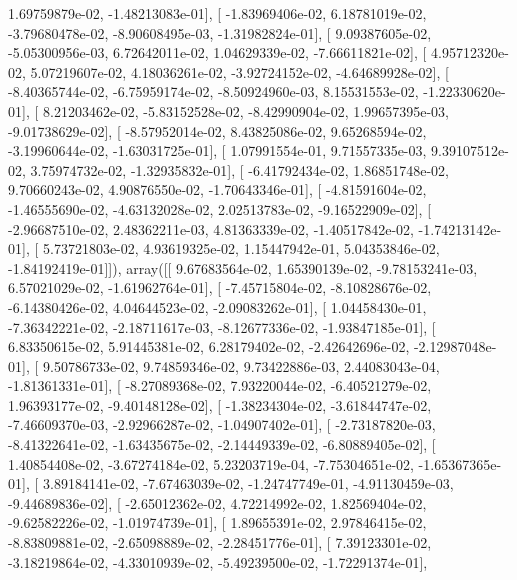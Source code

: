\documentclass{article}
\begin{document}
          1.69759879e-02,  -1.48213083e-01],
       [ -1.83969406e-02,   6.18781019e-02,  -3.79680478e-02,
         -8.90608495e-03,  -1.31982824e-01],
       [  9.09387605e-02,  -5.05300956e-03,   6.72642011e-02,
          1.04629339e-02,  -7.66611821e-02],
       [  4.95712320e-02,   5.07219607e-02,   4.18036261e-02,
         -3.92724152e-02,  -4.64689928e-02],
       [ -8.40365744e-02,  -6.75959174e-02,  -8.50924960e-03,
          8.15531553e-02,  -1.22330620e-01],
       [  8.21203462e-02,  -5.83152528e-02,  -8.42990904e-02,
          1.99657395e-03,  -9.01738629e-02],
       [ -8.57952014e-02,   8.43825086e-02,   9.65268594e-02,
         -3.19960644e-02,  -1.63031725e-01],
       [  1.07991554e-01,   9.71557335e-03,   9.39107512e-02,
          3.75974732e-02,  -1.32935832e-01],
       [ -6.41792434e-02,   1.86851748e-02,   9.70660243e-02,
          4.90876550e-02,  -1.70643346e-01],
       [ -4.81591604e-02,  -1.46555690e-02,  -4.63132028e-02,
          2.02513783e-02,  -9.16522909e-02],
       [ -2.96687510e-02,   2.48362211e-03,   4.81363339e-02,
         -1.40517842e-02,  -1.74213142e-01],
       [  5.73721803e-02,   4.93619325e-02,   1.15447942e-01,
          5.04353846e-02,  -1.84192419e-01]]), array([[  9.67683564e-02,   1.65390139e-02,  -9.78153241e-03,
          6.57021029e-02,  -1.61962764e-01],
       [ -7.45715804e-02,  -8.10828676e-02,  -6.14380426e-02,
          4.04644523e-02,  -2.09083262e-01],
       [  1.04458430e-01,  -7.36342221e-02,  -2.18711617e-03,
         -8.12677336e-02,  -1.93847185e-01],
       [  6.83350615e-02,   5.91445381e-02,   6.28179402e-02,
         -2.42642696e-02,  -2.12987048e-01],
       [  9.50786733e-02,   9.74859346e-02,   9.73422886e-03,
          2.44083043e-04,  -1.81361331e-01],
       [ -8.27089368e-02,   7.93220044e-02,  -6.40521279e-02,
          1.96393177e-02,  -9.40148128e-02],
       [ -1.38234304e-02,  -3.61844747e-02,  -7.46609370e-03,
         -2.92966287e-02,  -1.04907402e-01],
       [ -2.73187820e-03,  -8.41322641e-02,  -1.63435675e-02,
         -2.14449339e-02,  -6.80889405e-02],
       [  1.40854408e-02,  -3.67274184e-02,   5.23203719e-04,
         -7.75304651e-02,  -1.65367365e-01],
       [  3.89184141e-02,  -7.67463039e-02,  -1.24747749e-01,
         -4.91130459e-03,  -9.44689836e-02],
       [ -2.65012362e-02,   4.72214992e-02,   1.82569404e-02,
         -9.62582226e-02,  -1.01974739e-01],
       [  1.89655391e-02,   2.97846415e-02,  -8.83809881e-02,
         -2.65098889e-02,  -2.28451776e-01],
       [  7.39123301e-02,  -3.18219864e-02,  -4.33010939e-02,
         -5.49239500e-02,  -1.72291374e-01],
\end{document}
